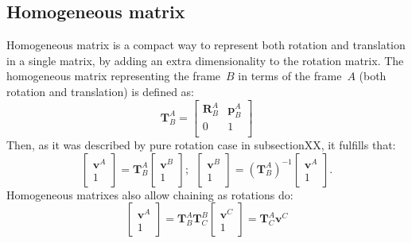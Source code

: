 \subsection{Homogeneous matrix}
Homogeneous matrix is a compact way to represent both rotation and translation in a single matrix, by adding an extra dimensionality to the rotation matrix.  
The homogeneous matrix representing the frame~$B$ in terms of the frame~$A$ (both rotation and translation) is defined as:
\begin{equation}
 \mathbf{T}^A_B = 
 \left[
 \begin{array}{cc}
  \mathbf{R}^A_B & \mathbf{p}^A_B \\
  0	& 	1 \\
 \end{array}
\right]
\end{equation}
Then, as it was described by pure rotation case in subsectionXX, it fulfills that:
\begin{equation}
\left[
 \begin{array}{c}
  \mathbf{v}^A \\
  1
 \end{array}
 \right]
 = \mathbf{T}^A_B 
 \left[
 \begin{array}{c}
  \mathbf{v}^B \\
  1
 \end{array}
 \right]; \ \
 \left[
 \begin{array}{c}
  \mathbf{v}^B \\
  1
 \end{array}
 \right]
  = (\mathbf{T}^A_B)^{-1} 
 \left[
 \begin{array}{c}
  \mathbf{v}^A \\
  1
 \end{array}
 \right].
\end{equation}
Homogeneous matrixes also allow chaining as rotations do:
\begin{equation}
 \left[
 \begin{array}{c}
  \mathbf{v}^A \\
  1
 \end{array}
 \right]
 = \mathbf{T}^A_B \mathbf{T}^B_C 
  \left[
 \begin{array}{c}
  \mathbf{v}^C \\
  1
 \end{array}
 \right]
 = \mathbf{T}^A_C \mathbf{v}^C
\end{equation}

